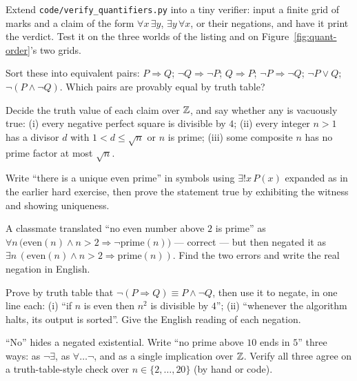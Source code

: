 \begin{exercise}[hard]
Extend \texttt{code/verify\_quantifiers.py} into a tiny verifier: input a finite
grid of marks and a claim of the form $\forall x\,\exists y$, $\exists y\,\forall x$,
or their negations, and have it print the verdict. Test it on the three worlds of
the listing and on Figure~\ref{fig:quant-order}'s two grids.
\end{exercise}
\begin{exercise}[easy]
Sort these into equivalent pairs: $P\Rightarrow Q$; $\lnot Q\Rightarrow\lnot P$;
$Q\Rightarrow P$; $\lnot P\Rightarrow\lnot Q$; $\lnot P\lor Q$; $\lnot(P\land\lnot Q)$.
Which pairs are provably equal by truth table?
\end{exercise}
\begin{exercise}[medium]
Decide the truth value of each claim over $\mathbb{Z}$, and say whether any is vacuously
true: (i) every negative perfect square is divisible by $4$; (ii) every integer
$n>1$ has a divisor $d$ with $1<d\le\sqrt{n}$ or $n$ is prime; (iii) some
composite $n$ has no prime factor at most $\sqrt{n}$.
\end{exercise}
\begin{exercise}[medium]
Write ``there is a unique even prime'' in symbols using $\exists!x\,P(x)$
expanded as in the earlier hard exercise, then prove the statement true by
exhibiting the witness and showing uniqueness.
\end{exercise}
\begin{exercise}[medium]
A classmate translated ``no even number above $2$ is prime'' as
$\forall n\,\bigl(\text{even}(n)\land n>2 \Rightarrow \lnot\text{prime}(n)\bigr)$
--- correct --- but then negated it as $\exists n\,(\text{even}(n)\land n>2
\Rightarrow \text{prime}(n))$. Find the two errors and write the real negation
in English.
\end{exercise}
\begin{exercise}[hard]
Prove by truth table that $\lnot(P\Rightarrow Q)\equiv P\land\lnot Q$, then use it
to negate, in one line each: (i) ``if $n$ is even then $n^2$ is divisible by $4$'';
(ii) ``whenever the algorithm halts, its output is sorted''. Give the English
reading of each negation.
\end{exercise}
\begin{exercise}[hard]
``No'' hides a negated existential. Write ``no prime above $10$ ends in $5$''
three ways: as $\lnot\exists$, as $\forall\ldots\lnot$, and as a single
implication over $\mathbb{Z}$. Verify all three agree on a truth-table-style check
over $n\in\{2,\dots,20\}$ (by hand or code).
\end{exercise}

